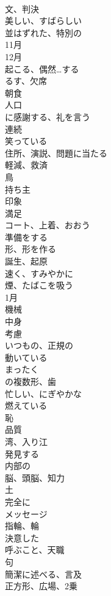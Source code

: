\documentclass[8pt]{extreport}
\begin{document}
\begin{CJK}{UTF8}{min}
\\	文、判決
\\	美しい、すばらしい
\\	並はずれた、特別の
\\	11月
\\	12月
\\	起こる、偶然…する
\\	るす、欠席
\\	朝食
\\	人口
\\	に感謝する、礼を言う
\\	連続
\\	笑っている
\\	住所、演説、問題に当たる
\\	軽減、救済
\\	鳥
\\	持ち主
\\	印象
\\	満足
\\	コート、上着、おおう
\\	準備をする
\\	形、形を作る
\\	誕生、起原
\\	速く、すみやかに
\\	煙、たばこを吸う
\\	1月
\\	機械
\\	中身
\\	考慮
\\	いつもの、正規の
\\	動いている
\\	まったく
\\	の複数形、歯
\\	忙しい、にぎやかな
\\	燃えている
\\	恥
\\	品質
\\	湾、入り江
\\	発見する
\\	内部の
\\	脳、頭脳、知力
\\	土
\\	完全に
\\	メッセージ
\\	指輪、輪
\\	決意した
\\	呼ぶこと、天職
\\	句
\\	簡潔に述べる、言及
\\	正方形、広場、2乗

\end{CJK}
\end{document}
